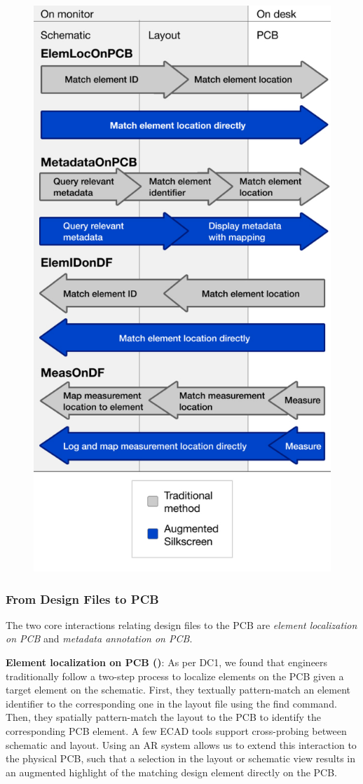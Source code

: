 \documentclass [11pt, proquest] {uwthesis}[2020/02/24]
\begin{document}
\begin{figure}
\centering
  \includegraphics[width=.35\linewidth]{AS_figures/InformationFlow/Information-flow-scheme.jpg}
  \label{fig:InformationFlow}
\end{figure}

\subsubsection{From Design Files to PCB}
The two core interactions relating design files to the PCB are \textit{element localization on PCB} and \textit{metadata annotation on PCB}.

\textbf{Element localization on PCB (\ElemLocOnPCB)}:
As per DC1, 
we found that engineers traditionally follow a two-step process to localize elements on the PCB given a target element on the schematic. First, they textually pattern-match an element identifier to the corresponding one in the layout file using the find command. Then, they spatially pattern-match the layout to the PCB to identify the corresponding PCB element.
A few ECAD tools \cite{AltiumSoftware, KiCadSoftware} support cross-probing between schematic and layout.
Using an AR system allows us to extend this interaction to the physical PCB, such that a selection in the layout or schematic view results in an augmented highlight of the matching design element directly on the PCB.
\end{document}
